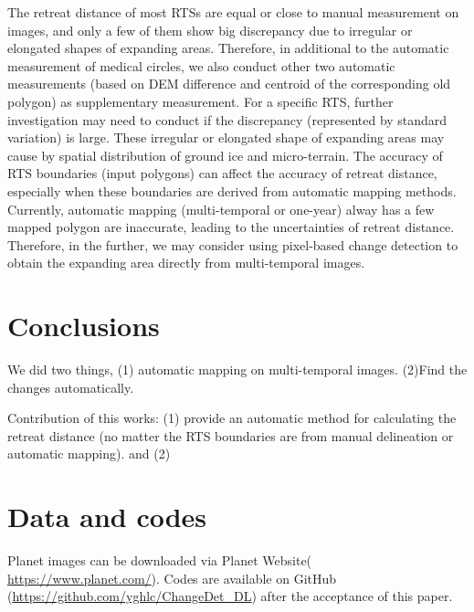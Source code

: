 \documentclass[authoryear,preprint,review,12pt]{elsarticle}
\begin{document}
The retreat distance of most RTSs are equal or close to manual measurement on images, and only a few of them show big discrepancy due to irregular or elongated shapes of expanding areas. 
Therefore, in additional to the automatic measurement of medical circles, we also conduct other two automatic measurements (based on DEM difference and centroid of the corresponding old polygon) as supplementary measurement. 
For a specific RTS, further investigation may need to conduct if the discrepancy (represented by standard variation) is large. 
These irregular or elongated shape of expanding areas may cause by spatial distribution of ground ice and micro-terrain.
The accuracy of RTS boundaries (input polygons) can affect the accuracy of retreat distance, especially when these boundaries are derived from automatic mapping methods. 
Currently, automatic mapping (multi-temporal or one-year) alway has a few mapped polygon are inaccurate, leading to the uncertainties of retreat distance. 
Therefore, in the further, we may consider using pixel-based change detection to obtain the expanding area directly from multi-temporal images. 



%


\section{Conclusions}
\label{sec_conclusion}

We did two things, (1) automatic mapping on multi-temporal images. 
(2)Find the changes automatically. 

 Contribution of this works: (1) provide an automatic method for calculating the retreat distance (no matter the RTS boundaries are from manual delineation or automatic mapping).
  and (2) 

\section{Data and codes}
\label{sec_data_codes}

Planet images can be downloaded via Planet Website( \url{https://www.planet.com/}). 
Codes are available on GitHub (\url{https://github.com/yghlc/ChangeDet_DL}) after the acceptance of this paper.
\end{document}
